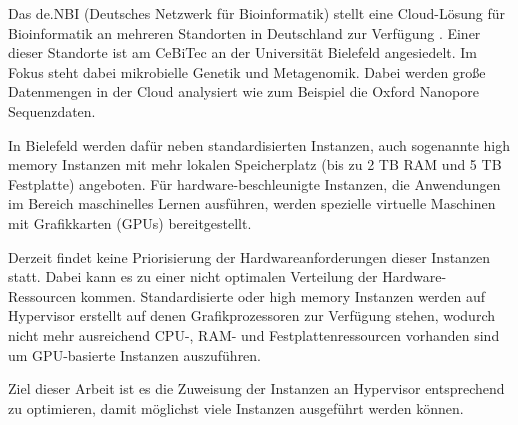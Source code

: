 \documentclass[../Main.tex]{subfiles}
\begin{document}
Das de.NBI (Deutsches Netzwerk für Bioinformatik) stellt eine Cloud-Lösung für Bioinformatik an mehreren Standorten in Deutschland zur Verfügung \citep{deNBI}.
Einer dieser Standorte ist am CeBiTec an der Universität Bielefeld angesiedelt.
Im Fokus steht dabei mikrobielle Genetik und Metagenomik. Dabei werden gro{\ss}e Datenmengen
in der Cloud analysiert wie zum Beispiel die Oxford Nanopore Sequenzdaten.

In Bielefeld werden dafür neben standardisierten Instanzen, auch sogenannte \glqq high memory\grqq{} Instanzen mit mehr
lokalen Speicherplatz (bis zu 2 TB RAM und 5 TB Festplatte) angeboten. Für hardware-beschleunigte
Instanzen, die Anwendungen im Bereich maschinelles Lernen ausführen, werden spezielle virtuelle Maschinen
mit Grafikkarten (GPUs) bereitgestellt.

Derzeit findet keine Priorisierung der Hardwareanforderungen dieser Instanzen statt. Dabei kann es zu einer nicht optimalen
Verteilung der Hardware-Ressourcen kommen. Standardisierte oder high memory Instanzen werden
auf Hypervisor erstellt auf denen Grafikprozessoren zur Verfügung stehen, wodurch nicht mehr ausreichend CPU-, RAM- und Festplattenressourcen
vorhanden sind um GPU-basierte Instanzen auszuführen.

Ziel dieser Arbeit ist es die Zuweisung der Instanzen an Hypervisor entsprechend zu optimieren, damit möglichst viele Instanzen
ausgeführt werden können.

\biblio %
\end{document}
